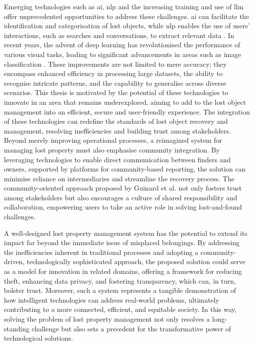 Emerging technologies such as \ac{ai}, \ac{nlp} and the increasing training and use of \ac{llm} offer unprecedented opportunities to address these challenges. \ac{ai} can facilitate the identification and categorisation of lost objects, while \ac{nlp} enables the use of users' interactions, such as searches and conversations, to extract relevant data \cite{Prawira2024}. In recent years, the advent of deep learning has revolutionised the performance of various visual tasks, leading to significant advancements in areas such as image classification \cite{Liu2022}. These improvements are not limited to mere accuracy; they encompass enhanced efficiency in processing large datasets, the ability to recognise intricate patterns, and the capability to generalise across diverse scenarios. This thesis is motivated by the potential of these technologies to innovate in an area that remains underexplored, aiming to add to the lost object management into an efficient, secure and user-friendly experience. The integration of these technologies can redefine the standards of lost object recovery and management, resolving inefficiencies and building trust among stakeholders. Beyond merely improving operational processes, a reimagined system for managing lost property must also emphasise community integration. By leveraging technologies to enable direct communication between finders and owners, supported by platforms for community-based reporting, the solution can minimise reliance on intermediaries and streamline the recovery process. The community-oriented approach proposed by Guinard et al. \cite{Guinard2008} not only fosters trust among stakeholders but also encourages a culture of shared responsibility and collaboration, empowering users to take an active role in solving lost-and-found challenges.

A well-designed lost property management system has the potential to extend its impact far beyond the immediate issue of misplaced belongings. By addressing the inefficiencies inherent in traditional processes and adopting a community-driven, technologically sophisticated approach, the proposed solution could serve as a model for innovation in related domains, offering a framework for reducing theft, enhancing data privacy, and fostering transparency, which can, in turn, bolster trust. Moreover, such a system represents a tangible demonstration of how intelligent technologies can address real-world problems, ultimately contributing to a more connected, efficient, and equitable society. In this way, solving the problem of lost property management not only resolves a long-standing challenge but also sets a precedent for the transformative power of technological solutions.

